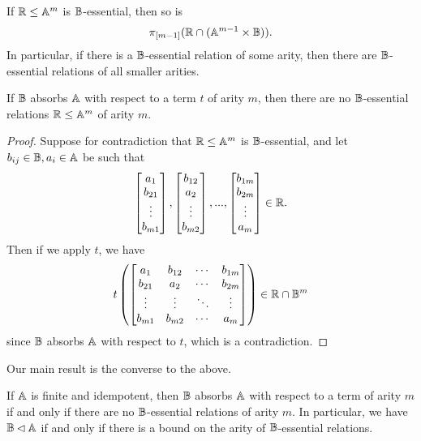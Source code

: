 \documentclass[letterpaper,11pt]{article}
\begin{document}
\begin{prop} If $\mathbb{R} \le \mathbb{A}^m$ is $\mathbb{B}$-essential, then so is
\[
\pi_{[m-1]}(\mathbb{R} \cap (\mathbb{A}^{m-1}\times\mathbb{B})).
\]
In particular, if there is a $\mathbb{B}$-essential relation of some arity, then there are $\mathbb{B}$-essential relations of all smaller arities.
\end{prop}

\begin{prop} If $\mathbb{B}$ absorbs $\mathbb{A}$ with respect to a term $t$ of arity $m$, then there are no $\mathbb{B}$-essential relations $\mathbb{R} \le \mathbb{A}^m$ of arity $m$.
\end{prop}
\begin{proof} Suppose for contradiction that $\mathbb{R} \le \mathbb{A}^m$ is $\mathbb{B}$-essential, and let $b_{ij} \in \mathbb{B}, a_i \in \mathbb{A}$ be such that
\[
\begin{bmatrix}a_1\\ b_{21}\\ \vdots\\ b_{m1}\end{bmatrix}, \begin{bmatrix}b_{12}\\ a_2\\ \vdots\\ b_{m2}\end{bmatrix}, ..., \begin{bmatrix}b_{1m}\\ b_{2m}\\ \vdots\\ a_m\end{bmatrix} \in \mathbb{R}.
\]
Then if we apply $t$, we have
\[
t\left(\begin{bmatrix}a_1 & b_{12} & \cdots & b_{1m}\\ b_{21} & a_2 & \cdots & b_{2m}\\ \vdots & \vdots & \ddots & \vdots\\ b_{m1} & b_{m2} & \cdots & a_m\end{bmatrix}\right) \in \mathbb{R} \cap \mathbb{B}^m
\]
since $\mathbb{B}$ absorbs $\mathbb{A}$ with respect to $t$, which is a contradiction.
\end{proof}

Our main result is the converse to the above.

\begin{thm}\label{absorption-essential} If $\mathbb{A}$ is finite and idempotent, then $\mathbb{B}$ absorbs $\mathbb{A}$ with respect to a term of arity $m$ if and only if there are no $\mathbb{B}$-essential relations of arity $m$. In particular, we have $\mathbb{B} \lhd \mathbb{A}$ if and only if there is a bound on the arity of $\mathbb{B}$-essential relations.
\end{thm}
\end{document}
